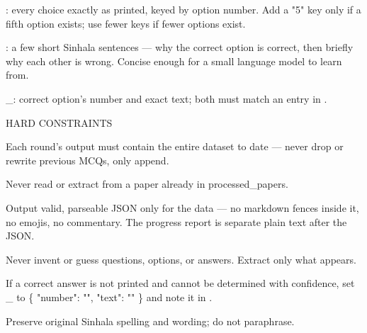 : every choice exactly as printed, keyed by option number. Add a "5" key only if a fifth option exists; use fewer keys if fewer options exist.

: a few short Sinhala sentences — why the correct option is correct, then briefly why each other is wrong. Concise enough for a small language model to learn from.

\_: correct option’s number and exact text; both must match an entry in .

\medskip

HARD CONSTRAINTS

\medskip

Each round’s output must contain the entire dataset to date — never drop or rewrite previous MCQs, only append.

Never read or extract from a paper already in processed\_papers.

Output valid, parseable JSON only for the data — no markdown fences inside it, no emojis, no commentary. The progress report is separate plain text after the JSON.

Never invent or guess questions, options, or answers. Extract only what appears.

If a correct answer is not printed and cannot be determined with confidence, set \_ to \{ "number": "", "text": "" \} and note it in .

Preserve original Sinhala spelling and wording; do not paraphrase.

